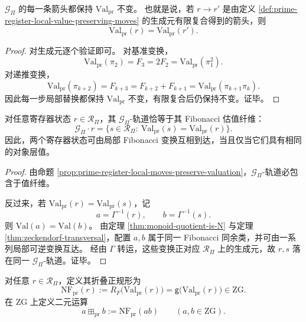 \begin{proposition}\label{prop:prime-register-local-moves-preserve-valuation}
\(\mathcal G_{\Pi}\) 的每一条箭头都保持 \(\mathrm{Val}_{\mathrm{pr}}\) 不变。
也就是说，若 \(r\to r'\) 是由定义 \ref{def:prime-register-local-value-preserving-moves} 的生成元有限复合得到的箭头，则
\[
\mathrm{Val}_{\mathrm{pr}}(r)=\mathrm{Val}_{\mathrm{pr}}(r').
\]
\end{proposition}

\begin{proof}
对生成元逐个验证即可。
对基准变换，
\[
\mathrm{Val}_{\mathrm{pr}}(\pi_2)=F_3=2F_2=\mathrm{Val}_{\mathrm{pr}}(\pi_1^2).
\]
对递推变换，
\[
\mathrm{Val}_{\mathrm{pr}}(\pi_{k+2})
=F_{k+3}
=F_{k+2}+F_{k+1}
=\mathrm{Val}_{\mathrm{pr}}(\pi_{k+1}\pi_k).
\]
因此每一步局部替换都保持 \(\mathrm{Val}_{\mathrm{pr}}\) 不变，有限复合后仍保持不变。证毕。
\end{proof}

\begin{theorem}[寄存器轨道与值纤维的一致性]\label{thm:prime-register-orbit-fiber-coincidence}
对任意寄存器状态 \(r\in\mathcal R_{\Pi}\)，其 \(\mathcal G_{\Pi}\)-轨道恰等于其 Fibonacci 估值纤维：
\[
\mathcal G_{\Pi}\cdot r
=
\{s\in\mathcal R_{\Pi}:\ \mathrm{Val}_{\mathrm{pr}}(s)=\mathrm{Val}_{\mathrm{pr}}(r)\}.
\]
因此，两个寄存器状态可由局部 Fibonacci 变换互相到达，当且仅当它们具有相同的对象层值。
\end{theorem}

\begin{proof}
由命题 \ref{prop:prime-register-local-moves-preserve-valuation}，\(\mathcal G_{\Pi}\)-轨道必包含于值纤维。

反过来，若 \(\mathrm{Val}_{\mathrm{pr}}(r)=\mathrm{Val}_{\mathrm{pr}}(s)\)，记
\[
a=\Gamma^{-1}(r),
\qquad
b=\Gamma^{-1}(s).
\]
则 \(\mathrm{Val}(a)=\mathrm{Val}(b)\)。
由定理 \ref{thm:monoid-quotient-is-N} 与定理 \ref{thm:zeckendorf-transversal}，配置 \(a,b\) 属于同一 Fibonacci 同余类，并可由一系列局部可逆变换互达。
经由 \(\Gamma\) 转运，这些变换正对应 \(\mathcal R_{\Pi}\) 上的生成元，故 \(r,s\) 落在同一 \(\mathcal G_{\Pi}\)-轨道。证毕。
\end{proof}

\begin{definition}[折叠正规形寄存器与内部加法]\label{def:prime-register-normal-form}
对任意 \(r\in\mathcal R_{\Pi}\)，定义其折叠正规形为
\[
\mathrm{NF}_{\mathrm{pr}}(r):=R_F\bigl(\mathrm{Val}_{\mathrm{pr}}(r)\bigr)=\mathsf g\bigl(\mathrm{Val}_{\mathrm{pr}}(r)\bigr)\in\mathrm{ZG}.
\]
在 \(\mathrm{ZG}\) 上定义二元运算
\[
a\boxplus_{\mathrm{pr}} b:=\mathrm{NF}_{\mathrm{pr}}(ab)
\qquad(a,b\in\mathrm{ZG}).
\]
\end{definition}

